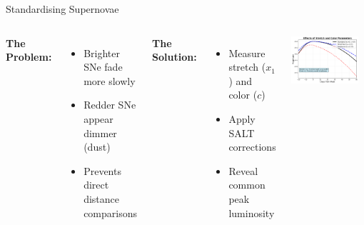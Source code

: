 \documentclass[aspectratio=169]{beamer}
\begin{document}
\begin{frame}{Standardising Supernovae}
  \begin{center}
  \end{center}
  \vfill
  \begin{columns}
    \scriptsize
    \textbf{The Problem:}
    \begin{itemize}
      \item Brighter SNe fade more slowly
      \item Redder SNe appear dimmer (dust)
      \item Prevents direct distance comparisons
    \end{itemize}
    \vspace{0.3cm}
    \textbf{The Solution:}
    \begin{itemize}
      \item Measure stretch ($x_1$) and color ($c$)
      \item Apply SALT corrections
      \item Reveal common peak luminosity
    \end{itemize}
    \centering
    \includegraphics[width=0.9\textwidth]{images/stretch_color_effects_plot.png}
  \end{columns}
\end{frame}
\end{document}
